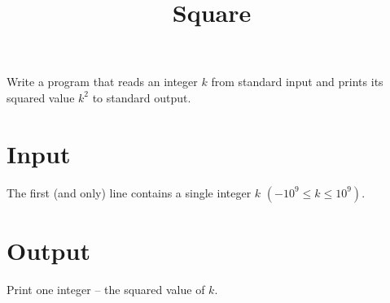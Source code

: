 \documentclass[zad,zawodnik,utf8,en]{sinol}
\title{Square}
\begin{document}
\begin{tasktext}

  \noindent
  Write a program that reads an integer $k$ from standard input and prints its squared
  value $k^2$ to standard output.

  \section{Input}

    The first (and only) line contains a single integer $k$ $(-10^9 \leq k \leq 10^9)$.

  \section{Output}

    Print one integer – the squared value of $k$.

\end{tasktext}
\end{document}

